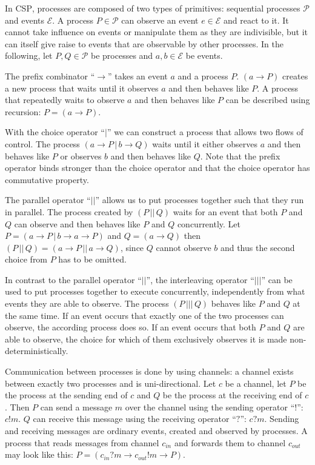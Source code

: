 In \textsc{CSP}, processes are composed of two types of primitives: sequential processes $\mathcal{P}$ and events $\mathcal{E}$. A process $P \in \mathcal{P}$ can observe an event $e \in \mathcal{E}$ and react to it. It cannot take influence on events or manipulate them as they are indivisible, but it can itself give raise to events that are observable by other processes. In the following, let $P, Q \in \mathcal{P}$ be processes and $a,b \in \mathcal{E}$ be events.

The prefix combinator \enquote{$\to$} takes an event $a$ and a process $P$. $\left( a \to P \right)$ creates a new process that waits until it observes $a$ and then behaves like $P$. A process that repeatedly waits to observe $a$ and then behaves like $P$ can be described using recursion: $P = \left( a \to P \right)$.

With the choice operator \enquote{$|$} we can construct a process that allows two flows of control. The process $\left( a \to P \,|\, b \to Q \right)$ waits until it either observes $a$ and then behaves like $P$ or observes $b$ and then behaves like $Q$. Note that the prefix operator binds stronger than the choice operator and that the choice operator has commutative property.

The parallel operator \enquote{$||$} allows us to put processes together such that they run in parallel. The process created by $\left( P \,||\, Q \right)$ waits for an event that both $P$ and $Q$ can observe and then behaves like $P$ and $Q$ concurrently. Let $P = \left( a \to P \,|\, b \to a \to P \right)$ and $Q = \left( a \to Q \right)$ then $\left( P \,||\, Q \right) = \left( a \to P \,||\, a \to Q \right)$, since $Q$ cannot observe $b$ and thus the second choice from $P$ has to be omitted.

In contrast to the parallel operator \enquote{$||$}, the interleaving operator \enquote{$|||$} can be used to put processes together to execute concurrently, independently from what events they are able to observe. The process $\left( P \,|||\, Q \right)$ behaves like $P$ and $Q$ at the same time. If an event occurs that exactly one of the two processes can observe, the according process does so. If an event occurs that both $P$ and $Q$ are able to observe, the choice for which of them exclusively observes it is made non-deterministically.

Communication between processes is done by using channels: a channel exists between exactly two processes and is uni-directional. Let $c$ be a channel, let $P$ be the process at the sending end of $c$ and $Q$ be the process at the receiving end of $c$. Then $P$ can send a message $m$ over the channel using the sending operator \enquote{$!$}: $c!m$. $Q$ can receive this message using the receiving operator \enquote{$?$}: $c?m$. Sending and receiving messages are ordinary events, created and observed by processes. A process that reads messages from channel $c_{in}$ and forwards them to channel $c_{out}$ may look like this: $P = \left( c_{in}?m \to c_{out}!m \to P \right)$.

